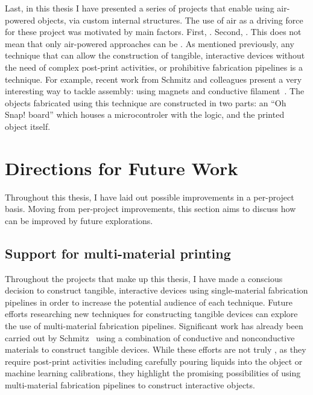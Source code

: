     Last, in this thesis I have presented a series of projects that enable \papf
    using air-powered objects, via custom internal structures. The use of air as
    a driving force for these project was motivated by  main factors.
    First, . Second, . This does not mean that
    only air-powered approaches can be \pap. As mentioned previously, any
    technique that can allow the construction of tangible, interactive devices
    without the need of complex post-print activities, or prohibitive
    fabrication pipelines is a \papf technique. For example, recent work from
    Schmitz and colleagues present a very interesting way to tackle assembly:
    using magnets and conductive filament~\cite{Schmitz:2021}. The objects
    fabricated using this technique are constructed in two parts: an ``Oh Snap!
    board'' which houses a microcontroler with the logic, and the printed object
    itself.

  \section{Directions for Future Work}
    Throughout this thesis, I have laid out possible improvements in a
    per-project basis. Moving from per-project improvements, this section aims
    to discuss how \papf can be improved by future explorations.

    \subsection{Support for multi-material printing}
      Throughout the projects that make up this thesis, I have made a conscious
      decision to construct tangible, interactive devices using single-material
      fabrication pipelines in order to increase the potential audience of each
      technique. Future efforts researching new \pap techniques for constructing
      tangible devices can explore the use of multi-material fabrication
      pipelines. Significant work has already been carried out by
      Schmitz~\cite{Schmitz:2019a} using a combination of conductive and
      nonconductive materials to construct tangible devices. While these efforts
      are not truly \pap, as they require post-print activities including
      carefully pouring liquids into the object or machine learning
      calibrations, they highlight the promising possibilities of using
      multi-material fabrication pipelines to construct interactive objects.

